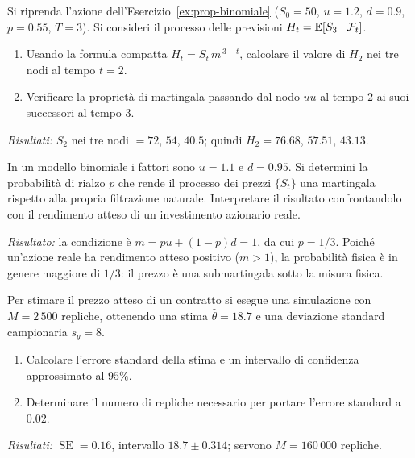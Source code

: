 \begin{exercise}
\label{ex:prop-previsioni}
Si riprenda l'azione dell'Esercizio~\ref{ex:prop-binomiale}
($S_0=50$, $u=1.2$, $d=0.9$, $p=0.55$, $T=3$). Si consideri il
processo delle previsioni $H_t=\mathbb{E}[S_3\mid\mathcal{F}_t]$.
\begin{enumerate}
\item Usando la formula compatta $H_t=S_t\,m^{\,3-t}$, calcolare il
valore di $H_2$ nei tre nodi al tempo $t=2$.
\item Verificare la propriet\`{a} di martingala passando dal nodo
$uu$ al tempo $2$ ai suoi successori al tempo $3$.
\end{enumerate}
\textit{Risultati:} $S_2$ nei tre nodi $=72$, $54$, $40.5$; quindi
$H_2=76.68$, $57.51$, $43.13$.
\end{exercise}

\begin{exercise}
\label{ex:prop-martingala}
In un modello binomiale i fattori sono $u=1.1$ e $d=0.95$. Si
determini la probabilit\`{a} di rialzo $p$ che rende il processo dei
prezzi $\{S_t\}$ una martingala rispetto alla propria filtrazione
naturale. Interpretare il risultato confrontandolo con il rendimento
atteso di un investimento azionario reale.

\smallskip
\textit{Risultato:} la condizione \`{e} $m=pu+(1-p)d=1$, da cui
$p=1/3$. Poich\'{e} un'azione reale ha rendimento atteso positivo
($m>1$), la probabilit\`{a} fisica \`{e} in genere maggiore di $1/3$:
il prezzo \`{e} una submartingala sotto la misura fisica.
\end{exercise}

\begin{exercise}
\label{ex:prop-montecarlo}
Per stimare il prezzo atteso di un contratto si esegue una simulazione
con $M=2\,500$ repliche, ottenendo una stima $\widehat{\theta}=18.7$
e una deviazione standard campionaria $s_g=8$.
\begin{enumerate}
\item Calcolare l'errore standard della stima e un intervallo di
confidenza approssimato al $95\%$.
\item Determinare il numero di repliche necessario per portare
l'errore standard a $0.02$.
\end{enumerate}
\textit{Risultati:} $\operatorname{SE}=0.16$, intervallo
$18.7\pm 0.314$; servono $M=160\,000$ repliche.
\end{exercise}

